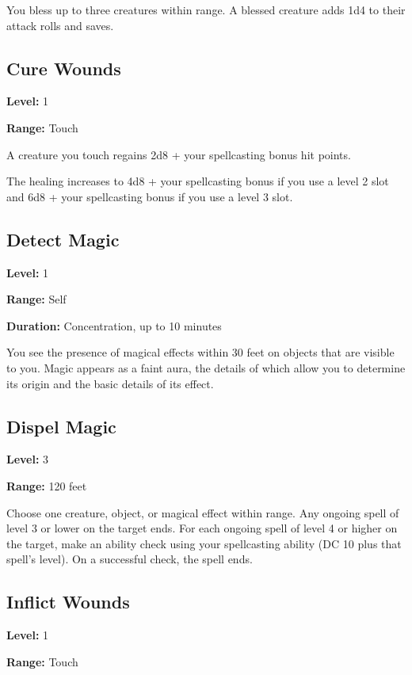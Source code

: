 \documentclass[12pt,letterpaper,twocolumn,openany,nodeprecatedcode,bg=none]{dndbook}
\let\oldsubsection\subsection
\renewcommand{\subsection}[1]{%
  \needspace{5\baselineskip}%
  \oldsubsection{#1}%
}
\begin{document}
You bless up to three creatures within range. A blessed creature adds
1d4 to their attack rolls and saves.

\subsection{Cure Wounds}\label{cure-wounds}

\textbf{Level:} 1

\textbf{Range:} Touch

A creature you touch regains 2d8 + your spellcasting bonus hit points.

The healing increases to 4d8 + your spellcasting bonus if you use a
level 2 slot and 6d8 + your spellcasting bonus if you use a level 3
slot.

\subsection{Detect Magic}\label{detect-magic}

\textbf{Level:} 1

\textbf{Range:} Self

\textbf{Duration:} Concentration, up to 10 minutes

You see the presence of magical effects within 30 feet on objects that
are visible to you. Magic appears as a faint aura, the details of which
allow you to determine its origin and the basic details of its effect.

\subsection{Dispel Magic}\label{dispel-magic}

\textbf{Level:} 3

\textbf{Range:} 120 feet

Choose one creature, object, or magical effect within range. Any ongoing
spell of level 3 or lower on the target ends. For each ongoing spell of
level 4 or higher on the target, make an ability check using your
spellcasting ability (DC 10 plus that spell's level). On a successful
check, the spell ends.

\subsection{Inflict Wounds}\label{inflict-wounds}

\textbf{Level:} 1

\textbf{Range:} Touch
\end{document}

